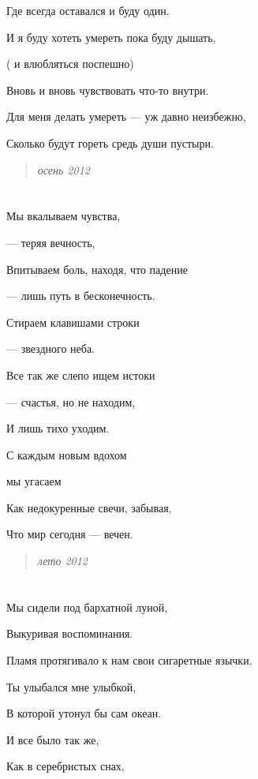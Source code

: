 \documentclass[
  a5paperpaper,
  DIV=11,
  numbers=noendperiod]{scrreprt}
\begin{document}
Где всегда оставался и буду один.

И я буду хотеть умереть пока буду дышать,

( и влюбляться поспешно)

Вновь и вновь чувствовать что-то внутри.

Для меня делать умереть --- уж давно неизбежно,

Сколько будут гореть средь души пустыри.

\begin{quote}
\emph{осень 2012}
\end{quote}

\section{}\label{section-3}

Мы вкалываем чувства,

--- теряя вечность,

Впитываем боль, находя, что падение

--- лишь путь в бесконечность.

Стираем клавишами строки

--- звездного неба.

Все так же слепо ищем истоки

--- счастья, но не находим,

И лишь тихо уходим.

С каждым новым вдохом

мы угасаем

Как недокуренные свечи, забывая,

Что мир сегодня --- вечен.

\begin{quote}
\emph{лето 2012}
\end{quote}

\section{}\label{section-4}

Мы сидели под бархатной луной,

Выкуривая воспоминания.

Пламя протягивало к нам свои сигаретные язычки.

Ты улыбался мне улыбкой,

В которой утонул бы сам океан.

И все было так же,

Как в серебристых снах,
\end{document}
